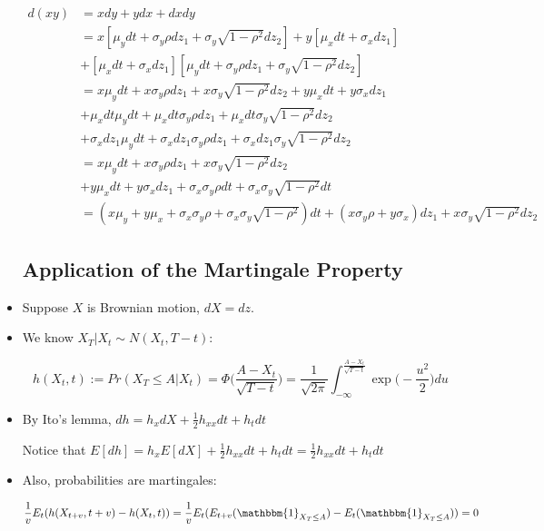 \documentclass{article}
\newcommand{\one}{\mathbbm{1}}
\begin{document}
\begin{itemize}
\begin{align*}
d(xy) 
&= xdy + ydx + dxdy\\
&= x[\mu_y dt + \sigma_y \rho dz_1 + \sigma_y \sqrt{1 - \rho^2} dz_2] + y[\mu_x dt + \sigma_x dz_1] \\
&+ [\mu_x dt + \sigma_x dz_1][\mu_y dt + \sigma_y \rho dz_1 + \sigma_y \sqrt{1 - \rho^2} dz_2]\\
&= x\mu_y dt + x\sigma_y \rho dz_1 + x\sigma_y \sqrt{1 - \rho^2} dz_2 + y\mu_x dt + y\sigma_x dz_1 \\
&+ \mu_x dt\mu_y dt + \mu_x dt\sigma_y \rho dz_1 + \mu_x dt\sigma_y \sqrt{1 - \rho^2} dz_2\\
&+\sigma_x dz_1\mu_y dt + \sigma_x dz_1\sigma_y \rho dz_1 + \sigma_x dz_1\sigma_y \sqrt{1 - \rho^2} dz_2\\
&= x\mu_y dt + x\sigma_y \rho dz_1 + x\sigma_y \sqrt{1 - \rho^2} dz_2 \\
&+ y\mu_x dt + y\sigma_x dz_1 + \sigma_x \sigma_y \rho dt + \sigma_x \sigma_y \sqrt{1 - \rho^2} dt\\
&= (x \mu_y + y \mu_x + \sigma_x \sigma_y \rho+ \sigma_x \sigma_y \sqrt{1-\rho^2}) dt + (x \sigma_y \rho + y \sigma_x)dz_1 + x \sigma_y \sqrt{1 - \rho^2} dz_2
\end{align*}

\subsection*{Application of the Martingale Property}

\item Suppose $X$ is Brownian motion, $dX = dz$.

\item We know $X_T | X_t \sim N(X_t, T - t)$:

$$
h(X_t, t) 
:= Pr(X_T \le A | X_t) 
= \Phi\Bigg(\frac{A - X_t}{\sqrt{T-t}}\Bigg) 
= \frac{1}{\sqrt{2\pi}} \int_{-\infty}^{\frac{A - X_t}{\sqrt{T - t}}} \exp \Bigg(- \frac{u^2}{2}\Bigg) du
$$

\item By Ito's lemma, $dh = h_x dX + \frac{1}{2} h_{xx} dt + h_t dt$ 

Notice that $E[dh] = h_x E[dX] + \frac{1}{2} h_{xx} dt + h_t dt = \frac{1}{2} h_{xx} dt + h_t dt$

\item Also, probabilities are martingales:

$$
\frac{1}{v} E_t(h(X_{t+v}, t+v) - h(X_t, t)) = \frac{1}{v} E_t(E_{t+v}(\one_{X_T \le A}) - E_{t}(\one_{X_T \le A})) = 0
$$


\end{itemize}
\end{document}
